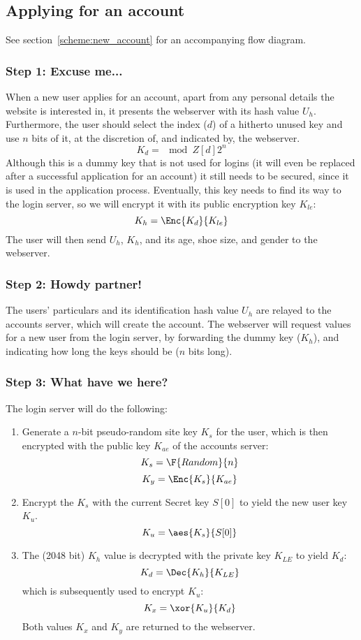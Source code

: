 \subsection{Applying for an account}
\label{sec:applying}
See section~\vref{scheme:new_account} for an accompanying flow diagram.
\subsubsection{Step 1: Excuse me...}
\label{sec:apply_step1}
When a new user applies for an account,
apart from any personal details the website is interested in,
it presents the webserver with its hash value $U_h$.
Furthermore,
the user should select the index ($d$) of a hitherto unused key and use $n$ bits of it,
at the discretion of,
and indicated by,
the webserver.
\[K_d=\mod{Z[d]}{2^n}\]
Although this is a dummy key that is not used for logins
(it will even be replaced after a successful application for an account)
it still needs to be secured,
since it is used in the application process.
Eventually,
this key needs to find its way to the login server,
so we will encrypt it with its public encryption key $K_{le}$:
\[K_h=\Enc{K_d}{K_{le}}\]
The user will then send $U_h$, $K_h$, and its age, shoe size, and gender to the webserver.

\subsubsection{Step 2: Howdy partner!}
\label{sec:apply_step2}
The users' particulars and its identification hash value $U_h$ are relayed to the accounts server,
which will create the account.
The webserver will request values for a new user from the login server,
by forwarding the dummy key ($K_h$),
and indicating how long the keys should be
($n$ bits long).

\subsubsection{Step 3: What have we here?}
\label{sec:apply_step3}
The login server will do the following:
\begin{enumerate}
\item Generate a $n$-bit pseudo-random site key $K_s$ for the user,
which is then encrypted with the public key $K_{ae}$ of the accounts server:
\[K_s=\F{Random}{n}\]
\[K_y=\Enc{K_s}{K_{ae}}\]
\item Encrypt the $K_s$ with the current Secret key $S[0]$ to yield the new user key $K_u$.
\[K_u=\aes{K_s}{S[0]}\]
\item The (2048 bit) $K_h$ value is decrypted with the private key $K_{LE}$ to yield $K_d$:
\[K_d=\Dec{K_h}{K_{LE}}\]
which is subsequently used to encrypt $K_u$:
\[K_x=\xor{K_u}{K_d}\]
Both values $K_x$ and $K_y$ are returned to the webserver.
\end{enumerate}

